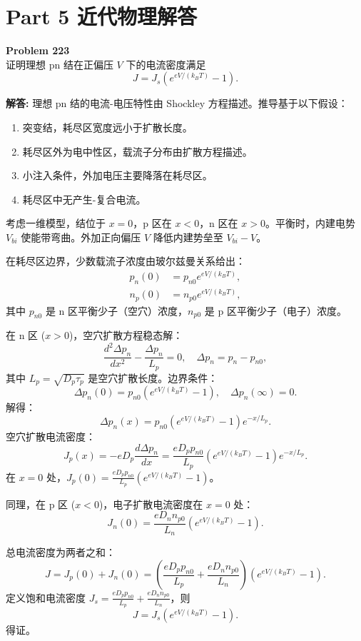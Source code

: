 \documentclass[12pt, a4paper, oneside]{ctexart}
\newenvironment{solution}{\par\noindent\textbf{解答:}\quad}{\par}
\begin{document}
\newpage
\section*{Part 5 近代物理解答}

\begin{mdframed}[backgroundcolor=gray!10, linewidth=0pt]
    \textbf{Problem 223} \\
    证明理想 pn 结在正偏压 $V$ 下的电流密度满足
    \[
    J = J_s \left( e^{eV/(k_B T)} - 1 \right).
    \]
\end{mdframed}
\begin{solution}
    理想 pn 结的电流-电压特性由 Shockley 方程描述。推导基于以下假设：
    \begin{enumerate}
        \item 突变结，耗尽区宽度远小于扩散长度。
        \item 耗尽区外为电中性区，载流子分布由扩散方程描述。
        \item 小注入条件，外加电压主要降落在耗尽区。
        \item 耗尽区中无产生-复合电流。
    \end{enumerate}
    
    考虑一维模型，结位于 $x=0$，p 区在 $x<0$，n 区在 $x>0$。平衡时，内建电势 $V_{bi}$ 使能带弯曲。外加正向偏压 $V$ 降低内建势垒至 $V_{bi}-V$。
    
    在耗尽区边界，少数载流子浓度由玻尔兹曼关系给出：
    \begin{align*}
        p_n(0) &= p_{n0} e^{eV/(k_B T)}, \\
        n_p(0) &= n_{p0} e^{eV/(k_B T)},
    \end{align*}
    其中 $p_{n0}$ 是 n 区平衡少子（空穴）浓度，$n_{p0}$ 是 p 区平衡少子（电子）浓度。
    
    在 n 区 ($x>0$)，空穴扩散方程稳态解：
    \[
    \frac{d^2 \Delta p_n}{dx^2} - \frac{\Delta p_n}{L_p} = 0, \quad \Delta p_n = p_n - p_{n0},
    \]
    其中 $L_p = \sqrt{D_p \tau_p}$ 是空穴扩散长度。边界条件：
    \[
    \Delta p_n(0) = p_{n0} (e^{eV/(k_B T)} - 1), \quad \Delta p_n(\infty) = 0.
    \]
    解得：
    \[
    \Delta p_n(x) = p_{n0} (e^{eV/(k_B T)} - 1) e^{-x/L_p}.
    \]
    空穴扩散电流密度：
    \[
    J_p(x) = -e D_p \frac{d \Delta p_n}{dx} = \frac{e D_p p_{n0}}{L_p} (e^{eV/(k_B T)} - 1) e^{-x/L_p}.
    \]
    在 $x=0$ 处，$J_p(0) = \frac{e D_p p_{n0}}{L_p} (e^{eV/(k_B T)} - 1)$。
    
    同理，在 p 区 ($x<0$)，电子扩散电流密度在 $x=0$ 处：
    \[
    J_n(0) = \frac{e D_n n_{p0}}{L_n} (e^{eV/(k_B T)} - 1).
    \]
    
    总电流密度为两者之和：
    \[
    J = J_p(0) + J_n(0) = \left( \frac{e D_p p_{n0}}{L_p} + \frac{e D_n n_{p0}}{L_n} \right) (e^{eV/(k_B T)} - 1).
    \]
    定义饱和电流密度 $J_s = \frac{e D_p p_{n0}}{L_p} + \frac{e D_n n_{p0}}{L_n}$，则
    \[
    J = J_s \left( e^{eV/(k_B T)} - 1 \right).
    \]
    得证。
\end{solution}
\end{document}

